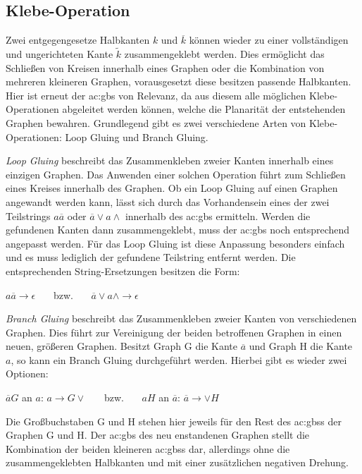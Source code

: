 \subsection{Klebe-Operation}
Zwei entgegengesetze Halbkanten \(k\) und \(\overline{k}\) können wieder zu einer vollständigen und ungerichteten Kante
\(\tilde{k}\) zusammengeklebt werden. Dies ermöglicht das Schließen von Kreisen innerhalb eines Graphen oder die Kombination von mehreren
kleineren Graphen, vorausgesetzt diese besitzen passende Halbkanten. Hier ist erneut der \gls{ac:gbs} von Relevanz, da aus diesem alle
möglichen Klebe-Operationen abgeleitet werden können, welche die Planarität der entstehenden Graphen bewahren. Grundlegend gibt es zwei
verschiedene Arten von Klebe-Operationen: Loop Gluing und Branch Gluing.

\textit{Loop Gluing} beschreibt das Zusammenkleben zweier Kanten innerhalb eines einzigen Graphen. Das Anwenden einer solchen Operation
führt zum Schließen eines Kreises innerhalb des Graphen. Ob ein Loop Gluing auf einen Graphen angewandt werden kann, lässt sich durch das
Vorhandensein eines der zwei Teilstrings \(a \overline{a}\) oder \(\overline{a}\vee a\wedge\) innerhalb des \gls{ac:gbs} ermitteln. Werden
die gefundenen Kanten dann zusammengeklebt, muss der \gls{ac:gbs} noch entsprechend angepasst werden. Für das Loop Gluing ist diese Anpassung
besonders einfach und es muss lediglich der gefundene Teilstring entfernt werden. Die entsprechenden String-Ersetzungen besitzen die Form:

\begin{center}
    \(a \overline{a} \longrightarrow \epsilon\) \ \ \ bzw. \ \ \ \(\overline{a}\vee a\wedge \longrightarrow \epsilon\) 
\end{center}

\textit{Branch Gluing} beschreibt das Zusammenkleben zweier Kanten von verschiedenen Graphen. Dies führt zur Vereinigung der beiden betroffenen
Graphen in einen neuen, größeren Graphen. Besitzt Graph G die Kante \(\overline{a}\) und Graph H die Kante \(a\), so kann ein Branch Gluing
durchgeführt werden. Hierbei gibt es wieder zwei Optionen:

\begin{center}
    \(\overline{a}G\) an \(a\): \(a \longrightarrow G \vee\) \ \ \ bzw. \ \ \ \(a H\) an \(\overline{a}\): \(\overline{a} \longrightarrow \vee H\)
\end{center}

Die Großbuchstaben G und H stehen hier jeweils für den Rest des \gls{ac:gbs}s der Graphen G und H. Der \gls{ac:gbs} des neu enstandenen Graphen
stellt die Kombination der beiden kleineren \gls{ac:gbs}s dar, allerdings ohne die zusammengeklebten Halbkanten und mit einer zusätzlichen
negativen Drehung.

